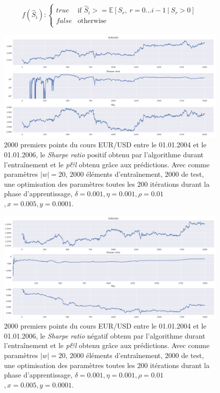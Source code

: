 \documentclass[a4paper, 11pt]{article}
\begin{document}
\begin{displaymath}
f(\widehat{S}_i):
\left \{
\begin{array}{rl}
true & \text{if\ \ } \widehat{S}_i >= \mathbb{E}[{S_r,\ r=0\dots i-1\ |\ S_r > 0}]\\
false & \text{otherwise} \\
\end{array}
\right.
\end{displaymath}

\begin{figure}
	\centering
	\includegraphics[scale=0.5]{res/Exemple_St_positif}
	\caption[Blup]{2000 premiers points du cours EUR/USD entre le 01.01.2004 et le 01.01.2006, le \textit{Sharpe ratio} positif obtenu par l'algorithme durant l'entraînement et le \textit{p\&l} obtenu grâce aux prédictions. Avec comme paramètres $|w| = 20$, $2000$ éléments d'entraînement, $2000$ de test, une optimisation des
		paramètres toutes les $200$ itérations durant la phase d'apprentissage, $\delta = 0.001, \eta=0.001,\rho=0.01$
		\footnotemark$, x = 0.005, y=0.0001$. }
	\label{exemple st positif}
\end{figure}

\begin{figure}
	\centering
	\includegraphics[scale=0.5]{res/Exemple_St_negatif}
	\caption[Blup]{2000 premiers points du cours EUR/USD entre le 01.01.2004 et le 01.01.2006, le \textit{Sharpe ratio} négatif obtenu par l'algorithme durant l'entraînement et le \textit{p\&l} obtenu grâce aux prédictions. Avec comme paramètres $|w| = 20$, $2000$ éléments d'entraînement, $2000$ de test, une optimisation des
		paramètres toutes les $200$ itérations durant la phase d'apprentissage, $\delta = 0.001, \eta=0.001,\rho=0.01$
		\footnotemark$, x = 0.005, y=0.0001$. }
	\label{exemple st negatif}
\end{figure}
\end{document}
